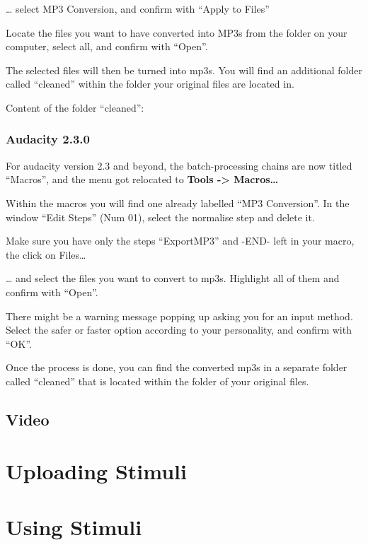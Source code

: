 \documentclass[]{book}
\begin{document}
\ldots{} select MP3 Conversion, and confirm with ``Apply to Files''

Locate the files you want to have converted into MP3s from the folder on your computer, select all, and confirm with ``Open''.

The selected files will then be turned into mp3s. You will find an additional folder called ``cleaned'' within the folder your original files are located in.

Content of the folder ``cleaned'':

\hypertarget{audacity-2.3.0}{%
\subsubsection{Audacity 2.3.0}\label{audacity-2.3.0}}

For audacity version 2.3 and beyond, the batch-processing chains are now titled ``Macros'', and the menu got relocated to \textbf{Tools -\textgreater{} Macros\ldots{}}

Within the macros you will find one already labelled ``MP3 Conversion''. In the window ``Edit Steps'' (Num 01), select the normalise step and delete it.

Make sure you have only the steps ``ExportMP3'' and -END- left in your macro, the click on Files\ldots{}

\ldots{} and select the files you want to convert to mp3s. Highlight all of them and confirm with ``Open''.

There might be a warning message popping up asking you for an input method. Select the safer or faster option according to your personality, and confirm with ``OK''.

Once the process is done, you can find the converted mp3s in a separate folder called ``cleaned'' that is located within the folder of your original files.

\hypertarget{video}{%
\subsection{Video}\label{video}}

\hypertarget{uploading-stimuli}{%
\section{Uploading Stimuli}\label{uploading-stimuli}}

\hypertarget{using-stimuli}{%
\section{Using Stimuli}\label{using-stimuli}}
\end{document}

